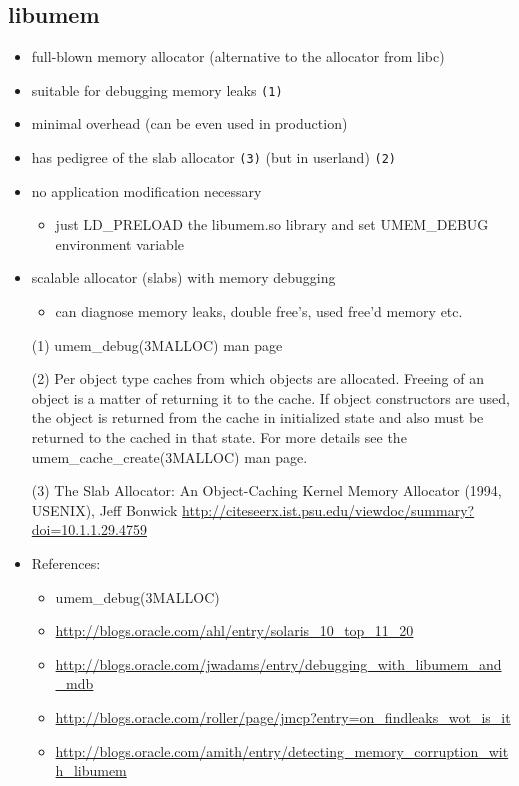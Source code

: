 \subsection{libumem}

\begin{itemize}
\item full-blown memory allocator (alternative to the allocator from libc)
\item suitable for debugging memory leaks \texttt{(1)}
\item minimal overhead (can be even used in production)
\item has pedigree of the slab allocator \texttt{(3)} (but in userland)
   \texttt{(2)}
\item no application modification necessary
  \begin{itemize}
  \item just LD\_PRELOAD the libumem.so library and set UMEM\_DEBUG environment
    variable
  \end{itemize}
\item scalable allocator (slabs) with memory debugging
  \begin{itemize}
  \item can diagnose memory leaks, double free's, used free'd memory etc.
  \end{itemize}
\end{itemize}

\begin{itemize}
\item[(1)] umem\_debug(3MALLOC) man page
\item[(2)] Per object type caches from which objects are allocated.
  Freeing of an object is a matter of returning it to the cache.
  If object constructors are used, the object is returned from the cache
  in initialized state and also must be returned to the cached in that state.
  For more details see the umem\_cache\_create(3MALLOC) man page.
\item[(3)] The Slab Allocator: An Object-Caching Kernel Memory Allocator
  (1994, USENIX), Jeff Bonwick
  \url{http://citeseerx.ist.psu.edu/viewdoc/summary?doi=10.1.1.29.4759}
\item References:
\begin{itemize}
  \item umem\_debug(3MALLOC)
  \item \url{http://blogs.oracle.com/ahl/entry/solaris\_10\_top\_11\_20}
  \item \url{http://blogs.oracle.com/jwadams/entry/debugging\_with\_libumem\_and\_mdb}
  \item \url{http://blogs.oracle.com/roller/page/jmcp?entry=on\_findleaks\_wot\_is\_it}
  \item \url{http://blogs.oracle.com/amith/entry/detecting\_memory\_corruption\_with\_libumem}
\end{itemize}
\end{itemize}

